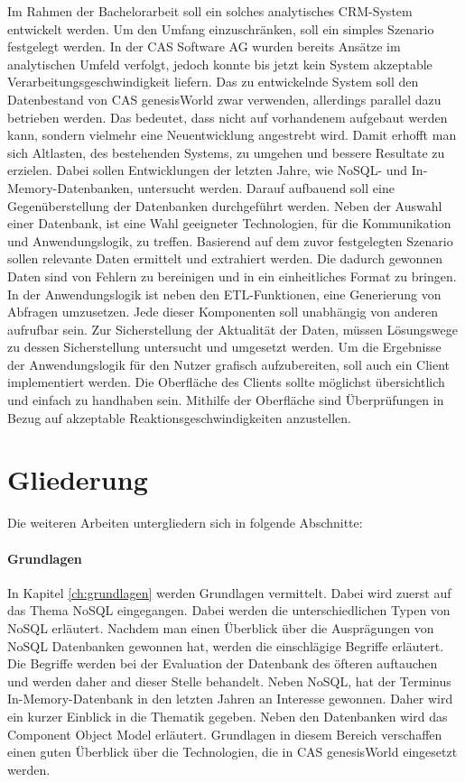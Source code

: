 Im Rahmen der Bachelorarbeit soll ein solches analytisches CRM-System entwickelt werden. Um den Umfang einzuschränken, soll ein simples Szenario festgelegt werden. In der CAS Software AG wurden bereits Ansätze im analytischen Umfeld verfolgt, jedoch konnte bis jetzt kein System akzeptable Verarbeitungsgeschwindigkeit liefern. Das zu entwickelnde System soll den Datenbestand von CAS genesisWorld zwar verwenden, allerdings parallel dazu betrieben werden. Das bedeutet, dass nicht auf vorhandenem aufgebaut werden kann, sondern vielmehr eine Neuentwicklung angestrebt wird. Damit erhofft man sich Altlasten, des bestehenden Systems, zu umgehen und bessere Resultate zu erzielen. Dabei sollen Entwicklungen der letzten Jahre, wie NoSQL- und In-Memory-Datenbanken, untersucht werden. Darauf aufbauend soll eine Gegenüberstellung der Datenbanken durchgeführt werden. Neben der Auswahl einer Datenbank, ist eine Wahl geeigneter Technologien, für die Kommunikation und Anwendungslogik, zu treffen. Basierend auf dem zuvor festgelegten Szenario sollen relevante Daten ermittelt und extrahiert werden. Die dadurch gewonnen Daten sind von Fehlern zu bereinigen und in ein einheitliches Format zu bringen.
In der Anwendungslogik ist neben den ETL-Funktionen, eine Generierung von Abfragen umzusetzen. Jede dieser Komponenten soll unabhängig von anderen aufrufbar sein. Zur Sicherstellung der Aktualität der Daten, müssen Lösungswege zu dessen Sicherstellung untersucht und umgesetzt werden. Um die Ergebnisse der Anwendungslogik für den Nutzer grafisch aufzubereiten, soll auch ein Client implementiert werden. Die Oberfläche des Clients sollte möglichst übersichtlich und einfach zu handhaben sein. Mithilfe der Oberfläche sind Überprüfungen in Bezug auf akzeptable Reaktionsgeschwindigkeiten anzustellen. 

\section{Gliederung}

Die weiteren Arbeiten untergliedern sich in folgende Abschnitte: 
 
\paragraph{Grundlagen} In Kapitel \ref{ch:grundlagen} werden Grundlagen vermittelt. Dabei wird zuerst auf das Thema NoSQL eingegangen. Dabei werden die unterschiedlichen Typen von NoSQL erläutert. Nachdem man einen Überblick über die Ausprägungen von NoSQL Datenbanken gewonnen hat, werden die einschlägige Begriffe erläutert. Die Begriffe werden bei der Evaluation der Datenbank des öfteren auftauchen und werden daher and dieser Stelle behandelt. Neben NoSQL, hat der Terminus In-Memory-Datenbank in den letzten Jahren an Interesse gewonnen. Daher wird ein kurzer Einblick in die Thematik gegeben. Neben den Datenbanken wird das Component Object Model erläutert. Grundlagen in diesem Bereich verschaffen einen guten Überblick über die Technologien, die in CAS genesisWorld eingesetzt werden. 

